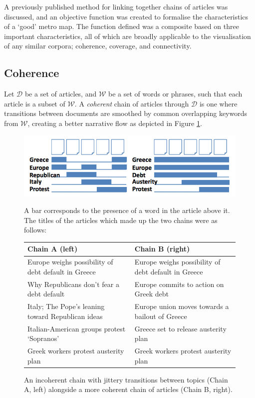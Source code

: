 A previously published method \citep{ConnectingTheDots} for linking together chains of articles  was discussed, and an objective function was created to formalise the characteristics of a `good' metro map. The function defined was a composite based on three important characteristics, all of which are broadly applicable to the visualisation of any similar corpora; coherence, coverage, and connectivity.

\subsection{Coherence}
Let $\mathcal{D}$ be a set of articles, and $\mathcal{W}$ be a set of words or phrases, such that each article is a subset of $\mathcal{W}$. A \textit{coherent} chain of articles through $\mathcal{D}$ is one where transitions between documents are smoothed by common overlapping keywords from $\mathcal{W}$, creating a better narrative flow \citep{ConnectingTheDots} as depicted in Figure \ref{fig:coverage}.

\begin{figure}[htbp!]
	\centering
	\includegraphics[width=.7\textwidth]{img/lit-survey/coverage.png} \par
	 \scriptsize{A bar corresponds to the presence of a word in the article above it.\\The titles of the articles which made up the two chains were as follows:\\[0.2cm]
	 \begin{tabular}{|l|l|}
	 	\hline 
	 	Chain A (left) & Chain B (right) \\
	 	\hline
	 	Europe weighs possibility of debt default in Greece & Europe weighs possibility of debt default in Greece \\
	 	Why Republicans don't fear a debt default & Europe commits to action on Greek debt \\
	 	Italy; The Pope's leaning toward Republican ideas & Europe union moves towards a bailout of Greece \\
	 	Italian-American groups protest `Sopranos' & Greece set to release austerity plan \\
	 	Greek workers protest austerity plan & Greek workers protest austerity plan \\
	 	\hline
	 \end{tabular}\vspace{0.2cm}}
	 \caption{An incoherent chain with jittery transitions between topics (Chain A, left) alongside a more coherent chain of articles (Chain B, right). \citep{GeneratingInformationMaps}}
	\label{fig:coverage}
\end{figure}

